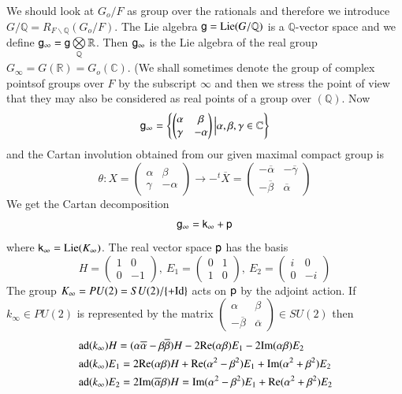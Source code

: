 We should look at $G_{o}/F$ as group over the rationals and therefore we introduce $G/\mathbb{Q}=R_{F\backslash \mathbb{Q}}(G_{o}/F)$. The Lie algebra $\mathsf{g}=\operatorname{Lie} (G/\mathbb{Q})$ is a $\mathbb{Q}$-vector space and we define $\mathsf{g}_{\infty}=\mathsf{g}\bigotimes\limits_{\mathbb{Q}}\mathbb{R}$. Then $\mathsf{g}_{\infty}$ is the Lie algebra of the real group $G_{\infty}=G(\mathbb{R})=G_{o}(\mathbb{C})$. (We shall sometimes denote the group of complex points\pageoriginale of groups over $F$ by the subscript $\infty$ and then we stress the point of view that they may also be considered as real points of a group over $(\mathbb{Q})$. Now
$$
\mathsf{g}_{\infty}=\left\{\left(\begin{matrix} \alpha & \beta\\ \gamma & -\alpha\end{matrix}\right)\Big| \alpha,\beta,\gamma\in \mathbb{C}\right\}
$$
and the Cartan involution obtained from our given maximal compact group is
$$
\theta:X=\left(\begin{matrix} \alpha & \beta\\ \gamma & -\alpha\end{matrix}\right)\to - {}^{t}\overline{X}=\left(\begin{matrix} -\overline{\alpha} & -\overline{\gamma}\\ -\overline{\beta} & \overline{\alpha}\end{matrix}\right)
$$
We get the Cartan decomposition
$$
\mathsf{g}_{\infty}=\mathsf{k}_{\infty}+\mathsf{p}
$$
where $\mathsf{k}_{\infty}=\operatorname{Lie} (K_{\infty})$. The real vector space $\mathsf{p}$ has the basis
$$
H=\left(\begin{matrix} 1 & 0\\ 0 & -1\end{matrix}\right), \ E_{1}=\left(\begin{matrix} 0 & 1\\ 1 & 0\end{matrix}\right), \ E_{2}=\left(\begin{matrix} i & 0\\ 0 & -i\end{matrix}\right)
$$
The group $K_{\infty}=PU(2)=SU(2)/\{+\mathrm{Id}\}$ acts on $\mathsf{p}$ by the adjoint action. If $k_{\infty}\in PU(2)$ is represented by the matrix $\left(\begin{smallmatrix} \alpha & \beta\\ -\overline{\beta} & \overline{\alpha}\end{smallmatrix}\right)\in SU(2)$ then
\setcounter{equation}{0}
\begin{align}
& \operatorname{ad}(k_{\infty})H=(\alpha\overline{\alpha}-\beta\overline{\beta})H-2\mathrm{Re}(\alpha\beta)E_{1}-2\mathrm{Im}(\alpha\beta)E_{2}\notag\\
& \operatorname{ad}(k_{\infty})E_{1}=2\mathrm{Re}(\alpha\beta)H+\mathrm{Re}(\alpha^{2}-\beta^{2})E_{1}+\mathrm{Im}(\alpha^{2}+\beta^{2})E_{2}\label{art2-eq1.4.1}\\
& \operatorname{ad}(k_{\infty})E_{2}=2\mathrm{Im}(\overline{\alpha}\beta)H=\mathrm{Im}(\alpha^{2}-\beta^{2})E_{1}+\mathrm{Re}(\alpha^{2}+\beta^{2})E_{2}\notag
\end{align}
